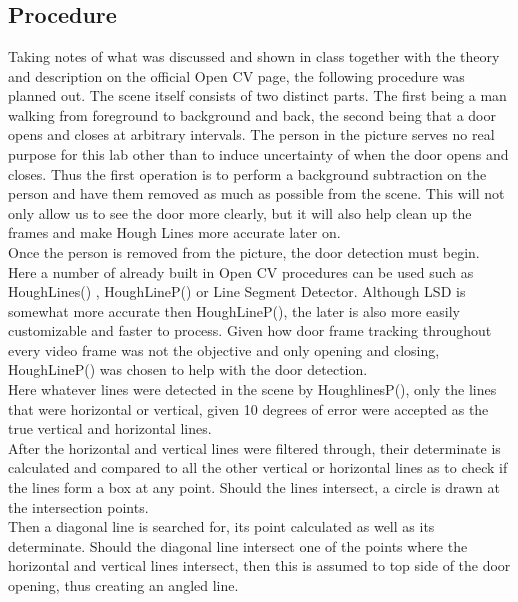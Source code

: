 \documentclass{article}
\begin{document}
\begin{lstlisting}




\end{lstlisting}
\subsection{Procedure}\label{sec:intro}
Taking notes of what was discussed and shown in class together with the theory and description on the official Open CV page, the following procedure was planned out. 
The scene itself consists of two distinct parts. The first being a man walking from foreground to background and back, the second being that a door opens and closes at arbitrary intervals. The person in the picture serves no real purpose for this lab other than to induce uncertainty of when the door opens and closes. Thus the first operation is to perform a background subtraction on the person and have them removed as much as possible from the scene. This will not only allow us to see the door more clearly, but it will also help clean up the frames and make Hough Lines more accurate later on.\\


Once the person is removed from the picture, the door detection must begin.\\ Here a number of already built in Open CV procedures can be used such as HoughLines() , HoughLineP() or Line Segment Detector. Although LSD is somewhat more accurate then HoughLineP(), the later is also more easily customizable and faster to process. Given how door frame tracking throughout every video frame was not the objective and only opening and closing, HoughLineP() was chosen to help with the door detection. \\
Here whatever lines were detected in the scene by HoughlinesP(), only the lines that were horizontal or vertical, given 10 degrees of error were accepted as the true vertical and horizontal lines.\\
After the horizontal and vertical lines were filtered through, their determinate is calculated and compared to all the other vertical or horizontal lines as to check if the lines form a box at any point. Should the lines intersect, a circle is drawn at the intersection points.\\
Then a diagonal line is searched for, its point calculated as well as its determinate. Should the diagonal line intersect one of the points where the horizontal and vertical lines intersect, then this is assumed to top side of the door opening, thus creating an angled line.\\ 
\end{document}
